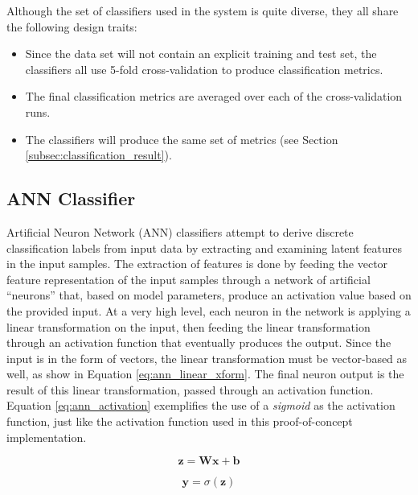 \documentclass[conference]{sig-alternate-05-2015}
\begin{document}
Although the set of classifiers used in the system is quite diverse, they all
share the following design traits:
\begin{itemize}
  \item Since the data set will not contain an explicit training and test set,
  the classifiers all use 5-fold cross-validation to produce classification
  metrics.
  \item The final classification metrics are averaged over each of the
  cross-validation runs.
  \item The classifiers will produce the same set of metrics (see Section
  \ref{subsec:classification_result}).
\end{itemize}

\subsection{ANN Classifier}\label{subsec:ann_classfier}

Artificial Neuron Network (ANN) classifiers attempt to derive discrete
classification labels from input data by extracting and examining latent
features in the input samples. The extraction of features is done by feeding
the vector feature representation of the input samples through a network of
artificial ``neurons'' that, based on model parameters, produce an activation
value based on the provided input. At a very high level, each neuron in the
network is applying a linear transformation on the input, then feeding the
linear transformation through an activation function that eventually produces
the output. Since the input is in the form of vectors, the linear transformation
must be vector-based as well, as show in Equation \ref{eq:ann_linear_xform}. The
final neuron output is the result of this linear transformation, passed through
an activation function. Equation \ref{eq:ann_activation} exemplifies the use of
a \textit{sigmoid} as the activation function, just like the activation function
used in this proof-of-concept implementation.\par

\noindent\hrulefill
\begin{equation}
  \label{eq:ann_linear_xform}
  \textbf{z} = \textbf{W}\textbf{x} + \textbf{b}
\end{equation}

\begin{equation}
  \label{eq:ann_activation}
  \textbf{y} = \sigma(\textbf{z})
\end{equation}
\end{document}
